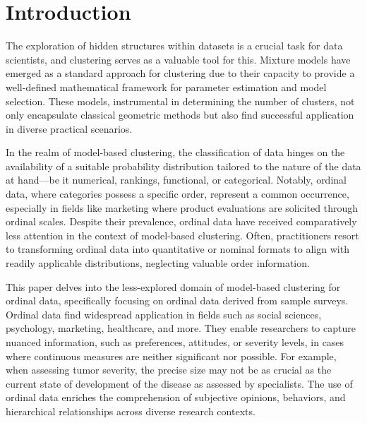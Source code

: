 
\section{Introduction}
The exploration of hidden structures within datasets is a crucial task for data scientists, and clustering serves as a valuable tool for this. Mixture models have emerged as a standard approach for clustering due to their capacity to provide a well-defined mathematical framework for parameter estimation and model selection. These models, instrumental in determining the number of clusters, not only encapsulate classical geometric methods but also find successful application in diverse practical scenarios.

In the realm of model-based clustering, the classification of data hinges on the availability of a suitable probability distribution tailored to the nature of the data at hand—be it numerical, rankings, functional, or categorical. Notably, ordinal data, where categories possess a specific order, represent a common occurrence, especially in fields like marketing where product evaluations are solicited through ordinal scales. Despite their prevalence, ordinal data have received comparatively less attention in the context of model-based clustering. Often, practitioners resort to transforming ordinal data into quantitative or nominal formats to align with readily applicable distributions, neglecting valuable order information.

This paper delves into the less-explored domain of model-based clustering for ordinal data, specifically focusing on ordinal data derived from sample surveys. Ordinal data find widespread application in fields such as social sciences, psychology, marketing, healthcare, and more. They enable researchers to capture nuanced information, such as preferences, attitudes, or severity levels, in cases where continuous measures are neither significant nor possible. For example, when assessing tumor severity, the precise size may not be as crucial as the current state of development of the disease as assessed by specialists. The use of ordinal data enriches the comprehension of subjective opinions, behaviors, and hierarchical relationships across diverse research contexts.


